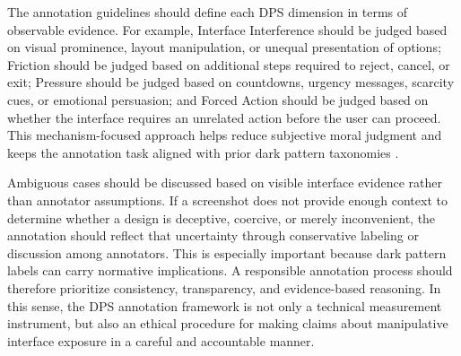 The annotation guidelines should define each DPS dimension in terms of observable evidence. For example, Interface Interference should be judged based on visual prominence, layout manipulation, or unequal presentation of options; Friction should be judged based on additional steps required to reject, cancel, or exit; Pressure should be judged based on countdowns, urgency messages, scarcity cues, or emotional persuasion; and Forced Action should be judged based on whether the interface requires an unrelated action before the user can proceed. This mechanism-focused approach helps reduce subjective moral judgment and keeps the annotation task aligned with prior dark pattern taxonomies \cite{gray2018darkpatterns,mathur2019darkpatterns,mathur2021whatmakesdark}.

Ambiguous cases should be discussed based on visible interface evidence rather than annotator assumptions. If a screenshot does not provide enough context to determine whether a design is deceptive, coercive, or merely inconvenient, the annotation should reflect that uncertainty through conservative labeling or discussion among annotators. This is especially important because dark pattern labels can carry normative implications. A responsible annotation process should therefore prioritize consistency, transparency, and evidence-based reasoning. In this sense, the DPS annotation framework is not only a technical measurement instrument, but also an ethical procedure for making claims about manipulative interface exposure in a careful and accountable manner.
